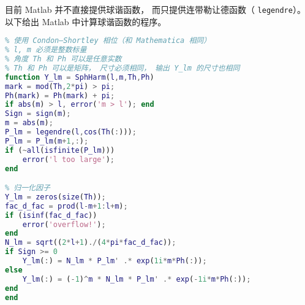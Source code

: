 
目前 Matlab 并不直接提供球谐函数， 而只提供连带勒让德函数（ \lstinline|legendre|）。 以下给出 Matlab 中计算球谐函数的程序。

\begin{lstlisting}[language=matlab, caption=SphHarm.m]
% 计算球谐函数 Y_{lm}
% 使用 Condon–Shortley 相位（和 Mathematica 相同）
% l, m 必须是整数标量
% 角度 Th 和 Ph 可以是任意实数
% Th 和 Ph 可以是矩阵， 尺寸必须相同， 输出 Y_lm 的尺寸也相同
function Y_lm = SphHarm(l,m,Th,Ph)
mark = mod(Th,2*pi) > pi;
Ph(mark) = Ph(mark) + pi;
if abs(m) > l, error('m > l'); end
Sign = sign(m);
m = abs(m);
P_lm = legendre(l,cos(Th(:)));
P_lm = P_lm(m+1,:);
if (~all(isfinite(P_lm)))
    error('l too large');
end

% 归一化因子
Y_lm = zeros(size(Th));
fac_d_fac = prod(l-m+1:l+m);
if (isinf(fac_d_fac))
    error('overflow!');
end
N_lm = sqrt((2*l+1)./(4*pi*fac_d_fac));
if Sign >= 0
    Y_lm(:) = N_lm * P_lm' .* exp(1i*m*Ph(:));
else
    Y_lm(:) = (-1)^m * N_lm * P_lm' .* exp(-1i*m*Ph(:));
end
end
\end{lstlisting}
